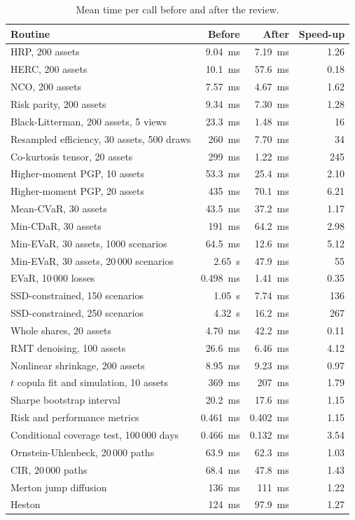 \begin{table}[htbp]
  \centering
  \caption{Mean time per call before and after the review.}
  \label{tab:performance:timings}
  \begin{tabular}{lrrr}
    \toprule
    Routine & Before & After & Speed-up \\
    \midrule
    HRP, 200 assets & 9.04~ms & 7.19~ms & 1.26 \\
    HERC, 200 assets & 10.1~ms & 57.6~ms & 0.18 \\
    NCO, 200 assets & 7.57~ms & 4.67~ms & 1.62 \\
    Risk parity, 200 assets & 9.34~ms & 7.30~ms & 1.28 \\
    Black-Litterman, 200 assets, 5 views & 23.3~ms & 1.48~ms & 16 \\
    Resampled efficiency, 30 assets, 500 draws & 260~ms & 7.70~ms & 34 \\
    Co-kurtosis tensor, 20 assets & 299~ms & 1.22~ms & 245 \\
    Higher-moment PGP, 10 assets & 53.3~ms & 25.4~ms & 2.10 \\
    Higher-moment PGP, 20 assets & 435~ms & 70.1~ms & 6.21 \\
    Mean-CVaR, 30 assets & 43.5~ms & 37.2~ms & 1.17 \\
    Min-CDaR, 30 assets & 191~ms & 64.2~ms & 2.98 \\
    Min-EVaR, 30 assets, 1000 scenarios & 64.5~ms & 12.6~ms & 5.12 \\
    Min-EVaR, 30 assets, 20\,000 scenarios & 2.65~s & 47.9~ms & 55 \\
    EVaR, 10\,000 losses & 0.498~ms & 1.41~ms & 0.35 \\
    SSD-constrained, 150 scenarios & 1.05~s & 7.74~ms & 136 \\
    SSD-constrained, 250 scenarios & 4.32~s & 16.2~ms & 267 \\
    Whole shares, 20 assets & 4.70~ms & 42.2~ms & 0.11 \\
    RMT denoising, 100 assets & 26.6~ms & 6.46~ms & 4.12 \\
    Nonlinear shrinkage, 200 assets & 8.95~ms & 9.23~ms & 0.97 \\
    $t$ copula fit and simulation, 10 assets & 369~ms & 207~ms & 1.79 \\
    Sharpe bootstrap interval & 20.2~ms & 17.6~ms & 1.15 \\
    Risk and performance metrics & 0.461~ms & 0.402~ms & 1.15 \\
    Conditional coverage test, 100\,000 days & 0.466~ms & 0.132~ms & 3.54 \\
    Ornstein-Uhlenbeck, 20\,000 paths & 63.9~ms & 62.3~ms & 1.03 \\
    CIR, 20\,000 paths & 68.4~ms & 47.8~ms & 1.43 \\
    Merton jump diffusion & 136~ms & 111~ms & 1.22 \\
    Heston & 124~ms & 97.9~ms & 1.27 \\
    \bottomrule
  \end{tabular}
\end{table}

